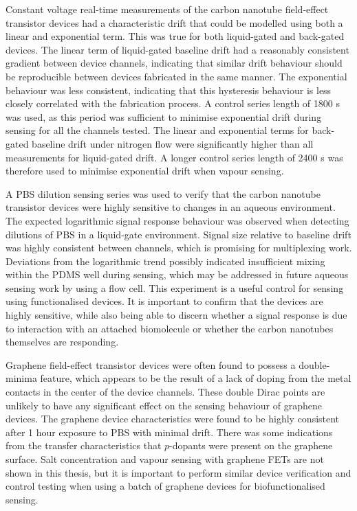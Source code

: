 \documentclass[
  a4paper,
]{scrbook}
\begin{document}
Constant voltage real-time measurements of the carbon nanotube
field-effect transistor devices had a characteristic drift that could be
modelled using both a linear and exponential term. This was true for
both liquid-gated and back-gated devices. The linear term of
liquid-gated baseline drift had a reasonably consistent gradient between
device channels, indicating that similar drift behaviour should be
reproducible between devices fabricated in the same manner. The
exponential behaviour was less consistent, indicating that this
hysteresis behaviour is less closely correlated with the fabrication
process. A control series length of 1800 s was used, as this period was
sufficient to minimise exponential drift during sensing for all the
channels tested. The linear and exponential terms for back-gated
baseline drift under nitrogen flow were significantly higher than all
measurements for liquid-gated drift. A longer control series length of
2400 s was therefore used to minimise exponential drift when vapour
sensing.

A PBS dilution sensing series was used to verify that the carbon
nanotube transistor devices were highly sensitive to changes in an
aqueous environment. The expected logarithmic signal response behaviour
was observed when detecting dilutions of PBS in a liquid-gate
environment. Signal size relative to baseline drift was highly
consistent between channels, which is promising for multiplexing work.
Deviations from the logarithmic trend possibly indicated insufficient
mixing within the PDMS well during sensing, which may be addressed in
future aqueous sensing work by using a flow cell. This experiment is a
useful control for sensing using functionalised devices. It is important
to confirm that the devices are highly sensitive, while also being able
to discern whether a signal response is due to interaction with an
attached biomolecule or whether the carbon nanotubes themselves are
responding.

Graphene field-effect transistor devices were often found to possess a
double-minima feature, which appears to be the result of a lack of
doping from the metal contacts in the center of the device channels.
These double Dirac points are unlikely to have any significant effect on
the sensing behaviour of graphene devices. The graphene device
characteristics were found to be highly consistent after 1 hour exposure
to PBS with minimal drift. There was some indications from the transfer
characteristics that \(p\)-dopants were present on the graphene surface.
Salt concentration and vapour sensing with graphene FETs are not shown
in this thesis, but it is important to perform similar device
verification and control testing when using a batch of graphene devices
for biofunctionalised sensing.
\end{document}
